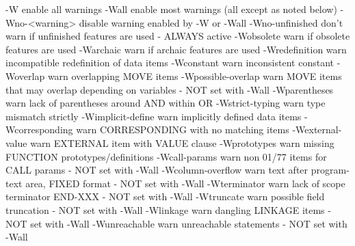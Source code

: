  -W                    enable all warnings
  -Wall                 enable most warnings (all except as noted below)
  -Wno-<warning>        disable warning enabled by -W or -Wall
  -Wno-unfinished      	don't warn if unfinished features are used
			- ALWAYS active
  -Wobsolete           	warn if obsolete features are used
  -Warchaic            	warn if archaic features are used
  -Wredefinition       	warn incompatible redefinition of data items
  -Wconstant           	warn inconsistent constant
  -Woverlap            	warn overlapping MOVE items
  -Wpossible-overlap   	warn MOVE items that may overlap depending on variables
			- NOT set with -Wall
  -Wparentheses        	warn lack of parentheses around AND within OR
  -Wstrict-typing      	warn type mismatch strictly
  -Wimplicit-define    	warn implicitly defined data items
  -Wcorresponding      	warn CORRESPONDING with no matching items
  -Wexternal-value     	warn EXTERNAL item with VALUE clause
  -Wprototypes         	warn missing FUNCTION prototypes/definitions
  -Wcall-params        	warn non 01/77 items for CALL params
			- NOT set with -Wall
  -Wcolumn-overflow    	warn text after program-text area, FIXED format
			- NOT set with -Wall
  -Wterminator         	warn lack of scope terminator END-XXX
			- NOT set with -Wall
  -Wtruncate           	warn possible field truncation
			- NOT set with -Wall
  -Wlinkage            	warn dangling LINKAGE items
			- NOT set with -Wall
  -Wunreachable        	warn unreachable statements
			- NOT set with -Wall

